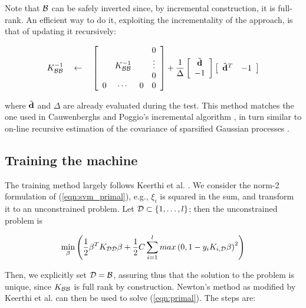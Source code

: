 Note that $\mathcal{B}$ can be safely inverted since, by incremental
construction, it is full-rank. An efficient way to do it, exploiting
the incrementality of the approach, is that of updating it
recursively:

\begin{equation} \label{eqn:inv_upd}
  K_{\mathcal{B}\mathcal{B}}^{-1} ~~~ \leftarrow ~~~
  \left[\begin{array}{cccc}
       &               &   & 0 \\
       & K_{\mathcal{B}\mathcal{B}}^{-1} &   & \vdots \\
       &               &   & 0 \\
     0 &       \cdots  & 0 & 0
  \end{array}\right]
  +
  \frac{1}{\Delta}
  \left[\begin{array}{c}
    \tilde{\mathbf{d}} \\
    -1
  \end{array}\right]
  \left[\begin{array}{cc}
    \tilde{\mathbf{d}}^T & -1
  \end{array}\right]
\end{equation}

where $\tilde{\mathbf{d}}$ and $\Delta$ are already evaluated during the test. This
method matches the one used in Cauwenberghs and Poggio's incremental
algorithm \cite{CauwenberghsP00}, in turn similar to on-line recursive
estimation of the covariance of sparsified Gaussian processes
\cite{csat'o01sparse}.

\subsection{Training the machine}

The training method largely follows Keerthi et
al. \cite{KeerthiDC05,KeerthiCDC06}. We consider the norm-2
formulation of (\ref{eqn:svm_primal}), e.g., $\xi_i$ is squared in the
sum, and transform it to an unconstrained problem. Let $\mathcal{D} \subset
\{1,\ldots,l\}$; then the unconstrained problem is

\begin{equation} \label{eqn:primal}
  \min_{\mathbf{\beta}} \left( 
      \frac{1}{2} \mathbf{\beta}^T K_{\mathcal{D}\mathcal{D}} \mathbf{\beta}
    + \frac{1}{2} C \sum_{i=1}^l max \left(0,1-y_i K_{i,\mathcal{D}} \mathbf{\beta} \right)^2
  \right)
\end{equation}

Then, we explicitly set $\mathcal{D} = \mathcal{B}$, assuring thus that the solution to
the problem is unique, since $K_{\mathcal{B}\mathcal{B}}$ is full rank by
construction. Newton's method as modified by Keerthi et
al. \cite{KeerthiDC05,KeerthiCDC06} can then be used to solve
(\ref{eqn:primal}). The steps are:

